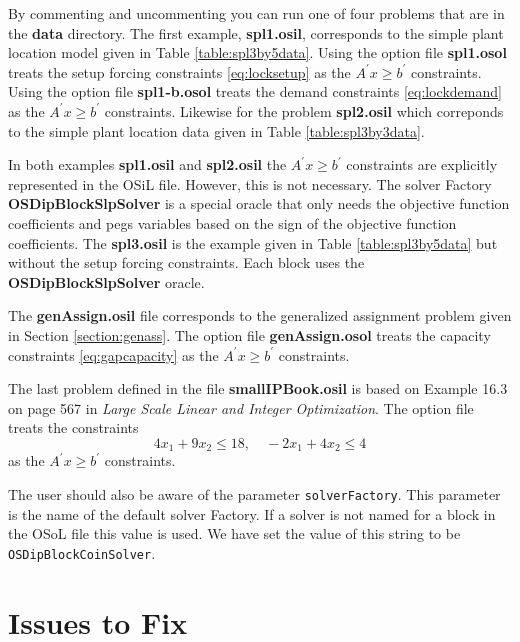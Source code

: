 \documentclass[11pt]{article}
\begin{document}
By commenting and uncommenting you can run one of four problems that are in the
{\bf data} directory. The first example, {\bf spl1.osil}, corresponds to the
simple plant location model given in Table \ref{table:spl3by5data}. Using the
option file {\bf spl1.osol} treats the setup forcing constraints
\ref{eq:locksetup} as the $A^{\prime} x \ge b^{\prime}$ constraints. Using the
option file {\bf spl1-b.osol} treats the demand constraints
\ref{eq:lockdemand} as the $A^{\prime} x \ge b^{\prime}$ constraints. Likewise
for the problem {\bf spl2.osil} which correponds to the simple plant location
data given in Table \ref{table:spl3by3data}.

In both examples {\bf spl1.osil} and {\bf spl2.osil} the $A^{\prime} x \ge
b^{\prime}$ constraints are explicitly represented in the OSiL file. However,
this is not necessary. The solver Factory {\bf OSDipBlockSlpSolver} is a special
oracle that only needs the objective function coefficients and pegs variables
based on the sign of the objective function coefficients. The {\bf spl3.osil} is
the example given in Table \ref{table:spl3by5data} but without the setup forcing
constraints. Each block uses the {\bf OSDipBlockSlpSolver} oracle. 

The {\bf genAssign.osil} file corresponds to the generalized assignment problem
given in Section \ref{section:genass}.  The option file {\bf genAssign.osol} 
treats the capacity constraints \ref{eq:gapcapacity} as the $A^{\prime} x \ge
b^{\prime}$ constraints. 

The last problem defined in the file {\bf smallIPBook.osil} is based on Example
16.3 on page 567 in {\it Large Scale Linear and Integer Optimization}.  The
option file treats the constraints
$$
4x_{1} + 9 x_{2} \le 18, \quad -2x_{1} + 4 x_{2} \le 4
$$
as the $A^{\prime} x \ge b^{\prime}$ constraints.

The user should also be aware of the parameter {\tt solverFactory}. This
parameter is the name of the default solver Factory. If a solver is not named
for a block in the OSoL file this value is used. We have set the value of this
string to be {\tt OSDipBlockCoinSolver}.


   


\section{Issues to Fix}
\end{document}
